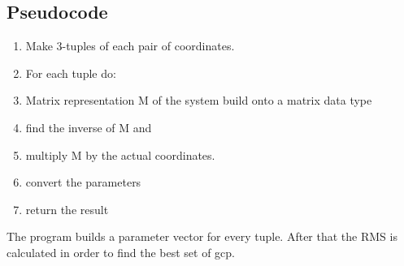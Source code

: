 \documentclass[12pt]{article}
\numberwithin{equation}{subsection}
\begin{document}
\subsection{Pseudocode}
\begin{enumerate}
\item Make 3-tuples of each pair of coordinates.
\item For each tuple do:
\item 	Matrix representation M of the system build onto a matrix data type
\item 	find the inverse of M and 
\item 	multiply M by the actual coordinates.
\item 	convert the parameters
\item 	return the result
\end{enumerate}
The program builds a parameter vector for every tuple. After that the RMS is calculated in order to find the best set of gcp.
%
%
%
%
%
%
\end{document}
